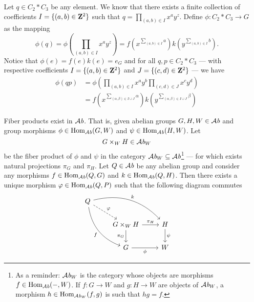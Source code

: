 \begin{remark}
  Let \(q \in C_2 * C_3\) be any element. We know that there exists a finite
  collection of coefficients \(I = \{(a, b) \in \mathbf{Z}^2\}\) such that \(q =
  \prod_{(a, b) \in I} x^a y^z\). Define \(\phi: C_2 * C_3 \to G\) as the
  mapping
  \[
    \phi(q) = \phi\left(\prod_{(a, b) \in I} x^a y^z\right)
    = f\left(x^{\sum_{(a,b) \in I} a}\right)
    k\left(y^{\sum_{(a,b) \in I} b}\right).
  \]
  Notice that \(\phi(e) = f(e) k(e) = e_G\) and for all \(q, p \in C_2 * C_3\)
  --- with respective coefficients \(I = \{(a, b) \in \mathbf{Z}^2\}\) and \(J = \{(c,d)
  \in \mathbf{Z}^2\}\) --- we have
  \begin{align*}
    \phi(qp)
    &= \phi\left(\prod_{(a, b) \in I} x^a y^b
      \prod_{(c, d) \in J} x^c y^d\right)
    \\
    &= f \left( x^{\sum_{(\alpha, \beta) \in I \cup J} \alpha} \right)
    k\left( y^{\sum_{(\alpha, \beta) \in I \cup J} \beta} \right)
  \end{align*}
\end{remark}

\begin{proposition}
  Fiber products exist in \({\mathcal{A}\textit{b}}\). That is, given abelian groups \(G, H, W \in
  {\mathcal{A}\textit{b}}\) and group morphisms \(\phi \in \operatorname{Hom}_{\mathcal{A}\textit{b}}(G, W)\) and \(\psi \in
  \operatorname{Hom}_{\mathcal{A}\textit{b}}(H, W)\). Let
  \[
    G \times_W H \in {\mathcal{A}\textit{b}}_W
  \]
  be the fiber product of \(\phi\) and \(\psi\) in the category \({\mathcal{A}\textit{b}}_W
  \subseteq {\mathcal{A}\textit{b}}\)\footnote{As a reminder: \({\mathcal{A}\textit{b}}_W\) is the category whose
  objects are morphisms \(f \in \operatorname{Hom}_{\mathcal{A}\textit{b}}(-, W)\). If \(f: G \to W\) and \(g: H
  \to W\) are objects of \({\mathcal{A}\textit{b}}_W\), a morphism \(h \in \operatorname{Hom}_{{\mathcal{A}\textit{b}}_W}(f, g)\) is
  such that \(hg = f\).}
  --- for which exists natural projections \(\pi_G\) and \(\pi_H\). Let \(Q \in
  {\mathcal{A}\textit{b}}\) be any abelian group and consider any morphisms \(f \in \operatorname{Hom}_{\mathcal{A}\textit{b}}(Q, G)\)
  and \(k \in \operatorname{Hom}_{\mathcal{A}\textit{b}}(Q, H)\). Then there exists a unique morphism \(\varphi
  \in \operatorname{Hom}_{\mathcal{A}\textit{b}}(Q, P)\) such that the following diagram commutes
  \[
    \begin{tikzcd}
      Q \ar[dr, dashed, "\varphi"] \ar[ddr, bend right, swap, "f"]
      \ar[drr, bend left, "k"]
      & & \\
      &G \times_W H \ar[r, "\pi_H"] \ar[d, swap, "\pi_G"] &H \ar[d, "\psi"] \\
      &G \ar[r, swap, "\phi"] &W
    \end{tikzcd}
  \]
\end{proposition}

